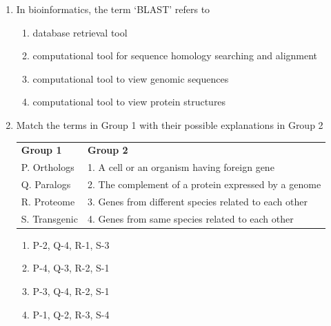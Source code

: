 \documentclass[journal,12pt,onecolumn]{IEEEtran}
\begin{document}
\begin{enumerate}
\begin{multicols}{2}
\begin{enumerate}[label=(\Alph*)]
    \item Both [a] and [r] are true and [r] is the correct reason for [a]
    \item Both [a] and [r] are true but [r] is not the correct reason for [a]
    \item [a] is true but [r] is false
    \item [a] is false but [r] is true
\end{enumerate}
\end{multicols}

\item In bioinformatics, the term ‘BLAST’ refers to
\begin{multicols}{2}
\begin{enumerate}[label=(\Alph*)]
    \item database retrieval tool
    \item computational tool for sequence homology searching and alignment
    \item computational tool to view genomic sequences
    \item computational tool to view protein structures
\end{enumerate}
\end{multicols}

\item Match the terms in Group 1 with their possible explanations in Group 2

\begin{center}
\begin{tabular}{ll}
\textbf{Group 1} & \textbf{Group 2} \\
P. Orthologs  & 1. A cell or an organism having foreign gene \\
Q. Paralogs   & 2. The complement of a protein expressed by a genome \\
R. Proteome   & 3. Genes from different species related to each other \\
S. Transgenic & 4. Genes from same species related to each other \\
\end{tabular}
\end{center}

\begin{multicols}{2}
\begin{enumerate}[label=(\Alph*)]
    \item P-2, Q-4, R-1, S-3
    \item P-4, Q-3, R-2, S-1
    \item P-3, Q-4, R-2, S-1
    \item P-1, Q-2, R-3, S-4
\end{enumerate}
\end{multicols}


\end{enumerate}
\end{document}
